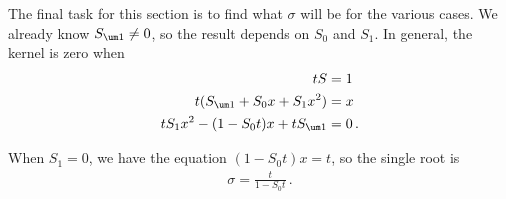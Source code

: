 The final task for this section is to find what $\sigma$ will be for the various cases. We already know $S_{\um 1} \neq 0$, so the result depends on $S_0$ and $S_1$. In general, the kernel is zero when
\begin{align}\begin{split}
	t S &= 1\\
	t(S_{\um 1} + S_0 x + S_1 x^2) &= x\\
	tS_1 x^2 -(1-S_0t)x + tS_{\um 1} &= 0\,.
\end{split}\end{align}

When $S_1 = 0$, we have the equation $(1-S_0t)x = t$, so the single root is
\begin{align}
	\sigma = \frac{t}{1-S_0t}\,.
\end{align}

